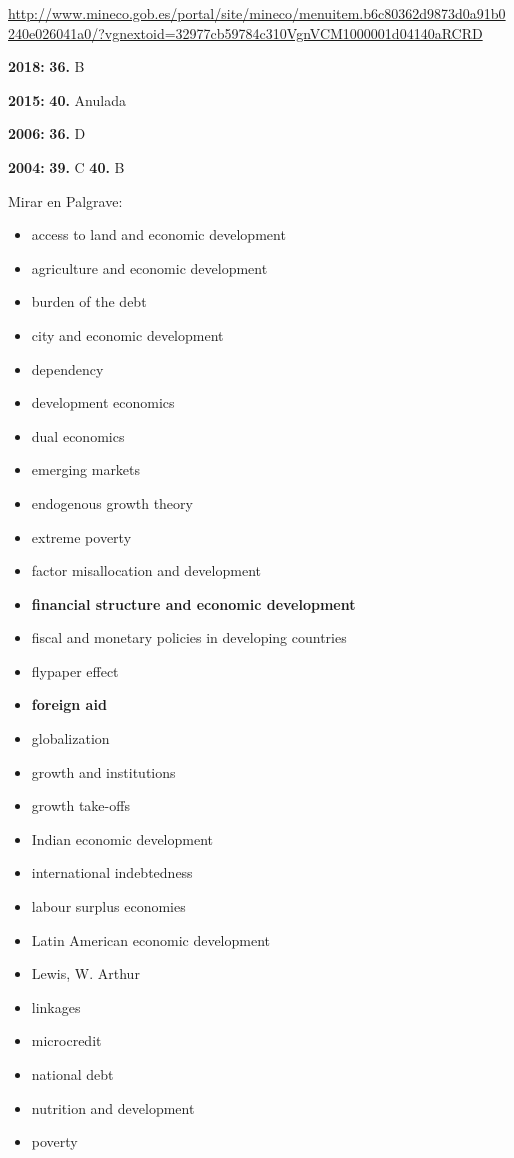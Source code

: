 \documentclass{nuevotema}
\begin{document}
\url{http://www.mineco.gob.es/portal/site/mineco/menuitem.b6c80362d9873d0a91b0240e026041a0/?vgnextoid=32977cb59784c310VgnVCM1000001d04140aRCRD}

\textbf{2018:} \textbf{36.} B

\textbf{2015:} \textbf{40.} Anulada

\textbf{2006:} \textbf{36.} D

\textbf{2004:} \textbf{39.} C \textbf{40.} B

\bibliografia

Mirar en Palgrave:

\begin{itemize}
	\item access to land and economic development
	\item agriculture and economic development
	\item burden of the debt
	\item city and economic development
	\item dependency
	\item development economics
	\item dual economics
	\item emerging markets
	\item endogenous growth theory
	\item extreme poverty
	\item factor misallocation and development
	\item \textbf{financial structure and economic development}
	\item fiscal and monetary policies in developing countries
	\item flypaper effect
	\item \textbf{foreign aid}
	\item globalization
	\item growth and institutions
	\item growth take-offs
	\item Indian economic development
	\item international indebtedness
	\item labour surplus economies
	\item Latin American economic development
	\item Lewis, W. Arthur
	\item linkages
	\item microcredit
	\item national debt
	\item nutrition and development
	\item poverty

\end{itemize}
\end{document}
